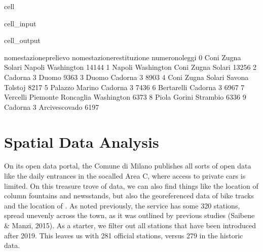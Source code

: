 \documentclass[letterpaper,10pt,english]{jupyterBook}
\begin{document}
\begin{sphinxuseclass}{cell}
\begin{sphinxuseclass}{cell_input}
\begin{sphinxVerbatim}[commandchars=\\\{\}]
 
\end{sphinxVerbatim}

\end{sphinxuseclass}
\begin{sphinxuseclass}{cell_output}
\begin{sphinxVerbatim}[commandchars=\\\{\}]
  nome\PYGZus{}stazione\PYGZus{}prelievo nome\PYGZus{}stazione\PYGZus{}restituzione  numero\PYGZus{}noleggi
0      Coni Zugna Solari        Napoli \PYGZhy{} Washington           14144
1    Napoli \PYGZhy{} Washington          Coni Zugna Solari           13256
2              Cadorna 3                      Duomo            9363
3                  Duomo                  Cadorna 3            8903
4      Coni Zugna Solari           Savona \PYGZhy{} Tolstoj            8217
5         Palazzo Marino                  Cadorna 3            7436
6             Bertarelli                  Cadorna 3            6967
7    Vercelli \PYGZhy{} Piemonte     Roncaglia \PYGZhy{} Washington            6373
8                  Piola          Gorini \PYGZhy{} Strambio            6336
9              Cadorna 3              Arcivescovado            6197
\end{sphinxVerbatim}

\end{sphinxuseclass}
\end{sphinxuseclass}

\section{Spatial Data Analysis}
\label{\detokenize{03-data_ingestion_and_spatial_operations:spatial-data-analysis}}
\sphinxAtStartPar
On its open data portal, the Comune di Milano publishes all sorts of open data \sphinxhyphen{} like the daily entrances in the so\sphinxhyphen{}called Area C, where access to private cars is limited. On this treasure trove of data, we can also find things like the location of column fountains and newsstands, but also the geo\sphinxhyphen{}referenced data of bike tracks and the location of . As noted previously, the service has some 320 stations, spread unevenly across the town, as it was outlined by previous studies (Saibene \& Manzi, 2015). As a starter, we filter out all stations that have been introduced after 2019. This leaves us with 281 official stations, versus 279 in the historic data.
\end{document}
